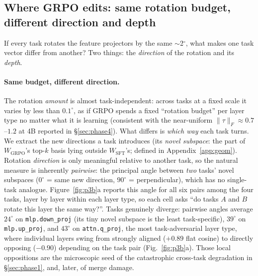 \documentclass{article}
\newcommand{\tv}{\tau}
\newcommand{\Wsft}{W_{\mathrm{SFT}}}
\newcommand{\Wg}{W_{\mathrm{GRPO}}}
\newcommand{\dg}{^{\circ}}
\begin{document}
\subsection{Where GRPO edits: same rotation budget, different direction and depth}

If every task rotates the feature projectors by the same $\sim$2$\dg$, what makes one task vector
differ from another? Two things: the \emph{direction} of the rotation and its \emph{depth}.

\paragraph{Same budget, different direction.} The rotation \emph{amount} is almost task-independent:
across tasks at a fixed scale it varies by less than $0.1\dg$, as if GRPO spends a fixed ``rotation
budget'' per layer type no matter what it is learning (consistent with the near-uniform
$\|\tv\|_F\!\approx\!0.7$--$1.2$ at 4B reported in \S\ref{sec:phase4}). What differs is \emph{which
way} each task turns. We extract the new directions a task introduces (its \emph{novel subspace}:
the part of $\Wg$'s top-$k$ basis lying outside $\Wsft$'s; defined in Appendix~\ref{app:geom}).
Rotation \emph{direction} is only meaningful relative to another task, so the natural measure is
inherently \emph{pairwise}: the principal angle between \emph{two} tasks' novel subspaces ($0\dg$ =
same new direction, $90\dg$ = perpendicular), which has no single-task analogue. Figure~\ref{fig:p3b}a
reports this angle for all six pairs among the four tasks, layer by layer within each layer type, so
each cell asks ``do tasks $A$ and $B$ rotate this layer the same way?''. Tasks genuinely
diverge: pairwise angles average $24\dg$ on \texttt{mlp.down\_proj} (its tiny novel subspace is the
least task-specific), $39\dg$ on \texttt{mlp.up\_proj}, and $43\dg$ on \texttt{attn.q\_proj}, the
most task-adversarial layer type, where individual layers swing from strongly aligned ($+0.89$
flat cosine) to directly opposing ($-0.90$) depending on the task pair (Fig.~\ref{fig:p3b}a). Those
local oppositions are the microscopic seed of the catastrophic cross-task degradation in
\S\ref{sec:phase1}, and, later, of merge damage.
\end{document}
